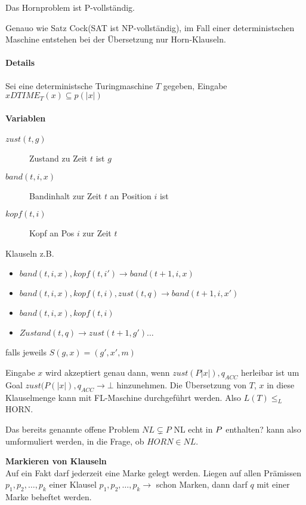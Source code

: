 \begin{satz}
    Das Hornproblem ist P-vollständig.
\end{satz}

\begin{beweis}
    Genauo wie Satz Cock(SAT ist NP-vollständig), im Fall einer
    deterministschen Maschine entstehen bei der Übersetzung nur
    Horn-Klauseln.
    \paragraph{Details}
    Sei eine deterministsche Turingmaschine $T$ gegeben, Eingabe $x DTIME_T(x) \subseteq p(|x|)$
    \paragraph{Variablen}
    \begin{description}
    \item[$zust(t,g)$] Zustand zu Zeit $t$ ist $g$
    \item[$band(t,i,x)$] Bandinhalt zur Zeit $t$ an Position $i$ ist
    \item[$kopf(t,i)$] Kopf an Pos $i$ zur Zeit $t$
    \end{description}

    Klauseln z.B.
    \begin{itemize}
    \item $band(t,i,x), kopf(t,i') \rightarrow band(t+1, i,x)$
    \item $band(t,i,x), kopf(t,i), zust(t,q) \rightarrow band(t+1, i, x')$
    \item $band(t,i,x), kopf(t,i)$
    \item $Zustand(t,q) \rightarrow zust(t+1, g')\dots$
    \end{itemize}
    falls jeweils $S(g,x) = (g', x', m)$

    Eingabe $x$ wird akzeptiert genau dann, wenn $zust(P|x|), q_{ACC}$
    herleibar ist um Goal $zust(P(|x|), q_{ACC} \rightarrow \bot$
    hinzunehmen.  Die Übersetzung von $T$, $x$ in diese Klauselmenge kann mit
    FL-Maschine durchgeführt werden. Also $L(T) \leq_{L}$ HORN.
\end{beweis}

Das bereits genannte offene Problem $NL \subsetneq P$ NL echt in $P$ enthalten?
kann also umformuliert werden, in die Frage, ob $HORN \in NL$.

\textbf{Markieren von Klauseln}
\\
Auf ein Fakt darf jederzeit eine Marke gelegt werden. Liegen auf allen
Prämissen $p_1, p_2, \dots, p_k$ einer Klausel
$p_1, p_2, \dots, p_k \rightarrow$ schon Marken,
dann darf $q$ mit einer Marke beheftet werden.








